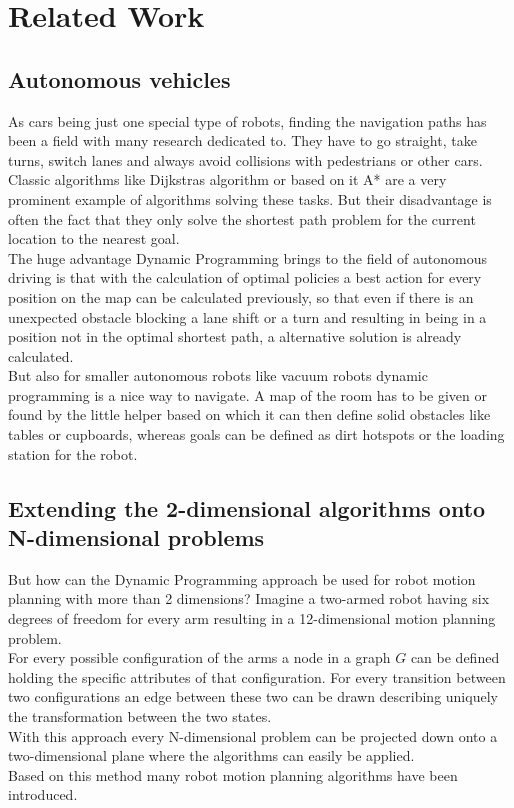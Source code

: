 \documentclass[conference]{IEEEtran}
\begin{document}
\section{Related Work}
\subsection{Autonomous vehicles}
As cars being just one special type of robots, finding the navigation paths has been a field with many research dedicated to. They have to go straight, take turns, switch lanes and always avoid collisions with pedestrians or other cars.\\
Classic algorithms like Dijkstras algorithm or based on it A* are a very prominent example of algorithms solving these tasks. But their disadvantage is often the fact that they only solve the shortest path problem for the current location to the nearest goal.\\
The huge advantage Dynamic Programming brings to the field of autonomous driving is that with the calculation of optimal policies a best action for every position on the map can be calculated previously, so that even if there is an unexpected obstacle blocking a lane shift or a turn and resulting in being in a position not in the optimal shortest path, a alternative solution is already calculated.\\
But also for smaller autonomous robots like vacuum robots dynamic programming is a nice way to navigate. A map of the room has to be given or found by the little helper based on which it can then define solid obstacles like tables or cupboards, whereas goals can be defined as dirt hotspots or the loading station for the robot.\\


\subsection{Extending the 2-dimensional algorithms onto N-dimensional problems}
But how can the Dynamic Programming approach be used for robot motion planning with more than 2 dimensions? Imagine a two-armed robot having six degrees of freedom for every arm resulting in a 12-dimensional motion planning problem.\\
For every possible configuration of the arms a node in a graph $G$ can be defined holding the specific attributes of that configuration. For every transition between two configurations an edge between these two can be drawn describing uniquely the transformation between the two states.\\
With this approach every N-dimensional problem can be projected down onto a two-dimensional plane where the algorithms can easily be applied.\\
Based on this method many robot motion planning algorithms have been introduced.
\end{document}
